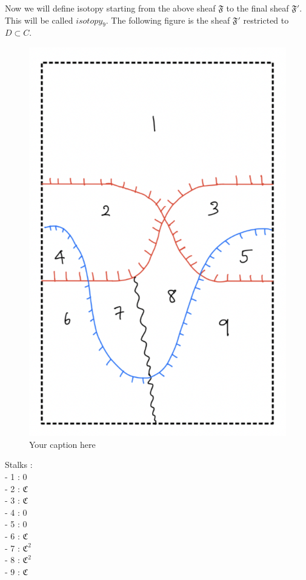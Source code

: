Now we will define isotopy starting from the above sheaf $\mathfrak{F}$ to the final sheaf $\mathfrak{F}'$. This will be called $isotopy_9$. The following figure is the sheaf $\mathfrak{F}'$ restricted to $D\subset C$.

\begin{figure}[H] %
    \centering
    \includegraphics[scale=0.95]{diagrams/lemma9/2.png} %
    \caption{Your caption here}
    \label{fig:your-label}
\end{figure}

Stalks : \\
- 1 : $0$\\
- 2 : $\mathfrak{C}$\\
- 3 : $\mathfrak{C}$\\
- 4 : $0$\\
- 5 : $0$\\
- 6 : $\mathfrak{C}$\\
- 7 : $\mathfrak{C}^2$\\
- 8 : $\mathfrak{C}^2$\\
- 9 : $\mathfrak{C}$\\


